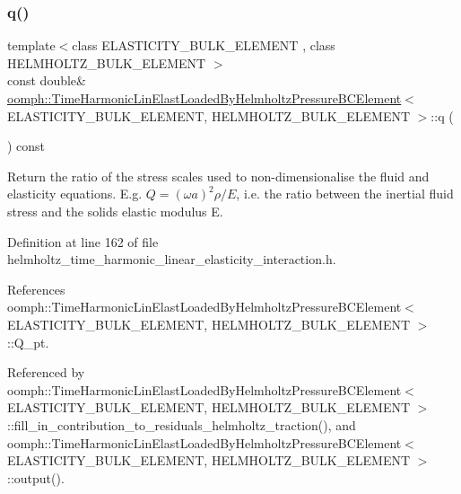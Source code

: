 \subsubsection{\texorpdfstring{q()}{q()}}
{\footnotesize\ttfamily template$<$class E\+L\+A\+S\+T\+I\+C\+I\+T\+Y\+\_\+\+B\+U\+L\+K\+\_\+\+E\+L\+E\+M\+E\+NT , class H\+E\+L\+M\+H\+O\+L\+T\+Z\+\_\+\+B\+U\+L\+K\+\_\+\+E\+L\+E\+M\+E\+NT $>$ \\
const double\& \hyperlink{classoomph_1_1TimeHarmonicLinElastLoadedByHelmholtzPressureBCElement}{oomph\+::\+Time\+Harmonic\+Lin\+Elast\+Loaded\+By\+Helmholtz\+Pressure\+B\+C\+Element}$<$ E\+L\+A\+S\+T\+I\+C\+I\+T\+Y\+\_\+\+B\+U\+L\+K\+\_\+\+E\+L\+E\+M\+E\+NT, H\+E\+L\+M\+H\+O\+L\+T\+Z\+\_\+\+B\+U\+L\+K\+\_\+\+E\+L\+E\+M\+E\+NT $>$\+::q (\begin{DoxyParamCaption}{ }\end{DoxyParamCaption}) const\hspace{0.3cm}{\ttfamily [inline]}}



Return the ratio of the stress scales used to non-\/dimensionalise the fluid and elasticity equations. E.\+g. $ Q = (\omega a)^2 \rho/E $, i.\+e. the ratio between the inertial fluid stress and the solid\textquotesingle{}s elastic modulus E. 



Definition at line 162 of file helmholtz\+\_\+time\+\_\+harmonic\+\_\+linear\+\_\+elasticity\+\_\+interaction.\+h.



References oomph\+::\+Time\+Harmonic\+Lin\+Elast\+Loaded\+By\+Helmholtz\+Pressure\+B\+C\+Element$<$ E\+L\+A\+S\+T\+I\+C\+I\+T\+Y\+\_\+\+B\+U\+L\+K\+\_\+\+E\+L\+E\+M\+E\+N\+T, H\+E\+L\+M\+H\+O\+L\+T\+Z\+\_\+\+B\+U\+L\+K\+\_\+\+E\+L\+E\+M\+E\+N\+T $>$\+::\+Q\+\_\+pt.



Referenced by oomph\+::\+Time\+Harmonic\+Lin\+Elast\+Loaded\+By\+Helmholtz\+Pressure\+B\+C\+Element$<$ E\+L\+A\+S\+T\+I\+C\+I\+T\+Y\+\_\+\+B\+U\+L\+K\+\_\+\+E\+L\+E\+M\+E\+N\+T, H\+E\+L\+M\+H\+O\+L\+T\+Z\+\_\+\+B\+U\+L\+K\+\_\+\+E\+L\+E\+M\+E\+N\+T $>$\+::fill\+\_\+in\+\_\+contribution\+\_\+to\+\_\+residuals\+\_\+helmholtz\+\_\+traction(), and oomph\+::\+Time\+Harmonic\+Lin\+Elast\+Loaded\+By\+Helmholtz\+Pressure\+B\+C\+Element$<$ E\+L\+A\+S\+T\+I\+C\+I\+T\+Y\+\_\+\+B\+U\+L\+K\+\_\+\+E\+L\+E\+M\+E\+N\+T, H\+E\+L\+M\+H\+O\+L\+T\+Z\+\_\+\+B\+U\+L\+K\+\_\+\+E\+L\+E\+M\+E\+N\+T $>$\+::output().

\mbox{\label{classoomph_1_1TimeHarmonicLinElastLoadedByHelmholtzPressureBCElement_a2b836c57f104d02c934615333f306a21}} 
